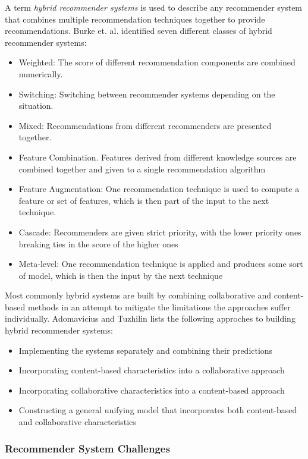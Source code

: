 A term \emph{hybrid recommender systems} is used to describe any recommender system that combines multiple recommendation techniques together to provide recommendations. Burke et. al. \cite{Burke2002} identified seven different classes of hybrid recommender systems:

\begin{itemize}
\item Weighted: The score of different recommendation components are combined numerically.
\item Switching: Switching between recommender systems depending on the situation.
\item Mixed: Recommendations from different recommenders are presented together.
\item Feature Combination. Features derived from different knowledge sources are combined together and given to a single recommendation algorithm
\item Feature Augmentation: One recommendation technique is used to compute a feature or set of features, which is then part of the input to the next technique.
\item Cascade: Recommenders are given strict priority, with the lower priority ones breaking ties in the score of the higher ones
\item Meta-level: One recommendation technique is applied and produces some sort of model, which is then the input by the next technique
\end{itemize}

Most commonly hybrid systems are built by combining collaborative and content-based methods in an attempt to mitigate the limitations the approaches suffer individually. Adomavicius and Tuzhilin \cite{Adomavicius2005} lists the following approches to building hybrid recommender systems:

\begin{itemize}
\item Implementing the systems separately and combining their predictions
\item Incorporating content-based characteristics into a collaborative approach
\item Incorporating collaborative characteristics into a content-based approach
\item Constructing a general unifying model that incorporates both content-based and collaborative characteristics
\end{itemize}

\subsubsection{Recommender System Challenges}

